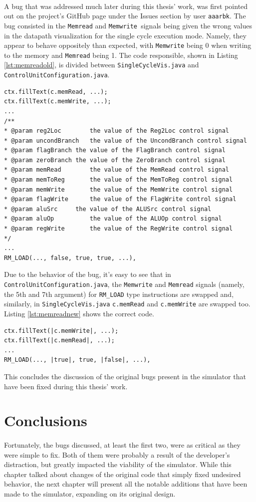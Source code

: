 \paragraph{}
A bug that was addressed much later during this thesis' work, was first pointed out on the project's GitHub page \cite{legv8simARMrepogit} under the Issues section by user \verb|aaarbk|. The bug consisted in the \verb|Memread| and \verb|Memwrite |signals being given the wrong values in the datapath visualization for the single cycle execution mode. Namely, they appear to behave oppositely than expected, with \verb|Memwrite| being 0 when writing to the memory and \verb|Memread| being 1. The code responsible, shown in Listing \ref{lst:memreadold}, is divided between \verb|SingleCycleVis.java| and \verb|ControlUnitConfiguration.java|.
\begin{lstlisting}[float, caption={The old Memread signal logic}, label={lst:memreadold}]
ctx.fillText(c.memRead, ...);
ctx.fillText(c.memWrite, ...);
...
/**
* @param reg2Loc		the value of the Reg2Loc control signal
* @param uncondBranch	the value of the UncondBranch control signal
* @param flagBranch	the value of the FlagBranch control signal
* @param zeroBranch	the value of the ZeroBranch control signal
* @param memRead		the value of the MemRead control signal
* @param memToReg		the value of the MemToReg control signal
* @param memWrite		the value of the MemWrite control signal
* @param flagWrite		the value of the FlagWrite control signal
* @param aluSrc		the value of the ALUSrc control signal
* @param aluOp			the value of the ALUOp control signal
* @param regWrite		the value of the RegWrite control signal
*/
...
RM_LOAD(..., false, true, true, ...),
\end{lstlisting}
Due to the behavior of the bug, it's easy to see that in \verb|ControlUnitConfiguration.java|, the \verb|Memwrite| and \verb|Memread| signals (namely, the 5th and 7th argument) for  \verb|RM_LOAD| type instructions are swapped and, similarly, in \verb|SingleCycleVis.java| \verb|c.memRead| and \verb|c.memWrite| are swapped too. Listing \ref{lst:memreadnew} shows the correct code.
\begin{lstlisting}[float, caption={The fixed Memread signal logic}, label={lst:memreadnew}]
ctx.fillText(|c.memWrite|, ...);
ctx.fillText(|c.memRead|, ...);
...
RM_LOAD(..., |true|, true, |false|, ...),
\end{lstlisting}
This concludes the discussion of the original bugs present in the simulator that have been fixed during this thesis' work.
\section{Conclusions}
\paragraph{}
Fortunately, the bugs discussed, at least the first two, were as critical as they were simple to fix. Both of them were probably a result of the developer's distraction, but greatly impacted the viability of the simulator. While this chapter talked about changes of the original code that simply fixed undesired behavior, the next chapter will present all the notable additions that have been made to the simulator, expanding on its original design.